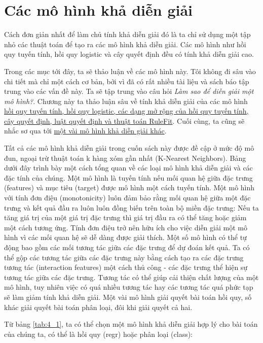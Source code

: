 \chapter{Các mô hình khả diễn giải}
Cách đơn giản nhất để làm chủ tính khả diễn giải đó là ta chỉ sử dụng một tập nhỏ các thuật toán để tạo ra các mô hình khả diễn giải. Các mô hình như hồi quy tuyến tính, hồi quy logistic và cây quyết định đều có tính khả diễn giải cao.

Trong các mục tới đây, ta sẽ thảo luận về các mô hình này. Tôi không đi sâu vào chi tiết mà chỉ một cách cơ bản, bởi vì đã có rất nhiều tài liệu và sách báo tập trung vào các vấn đề này. Ta sẽ tập trung vào câu hỏi \textit{Làm sao để diễn giải một mô hình?}. Chương này ta thảo luận sâu về tính khả diễn giải của các mô hình \href{TODO}{hồi quy tuyến tính, hồi quy logistic, các dạng mở rộng của hồi quy tuyến tính, cây quyết định, luật quyết định và thuật toán RuleFit}. Cuối cùng, ta cũng sẽ nhắc sơ qua tới \href{TODO}{một vài mô hình khả diễn giải khác}. 

Tất cả các mô hình khả diễn giải trong cuốn sách này được đề cập ở mức độ mô đun, ngoại trừ thuật toán k hàng xóm gần nhất (K-Nearest Neighbors). Bảng dưới đây trình bày một cách tổng quan về các loại mô hình khả diễn giải và các đặc tính của chúng. Một mô hình là tuyến tính nếu mối quan hệ giữa đặc trưng (features) và mục tiêu (target) được mô hình một cách tuyến tính. Một mô hình với tính đơn điệu (monotonicity) luôn đảm bảo rằng mối quan hệ giữa một đặc trưng và kết quả đầu ra luôn luôn đồng biến trên toàn bộ miền đặc trưng: Nếu ta tăng giá trị của một giá trị đặc trưng thì giá trị đầu ra có thể tăng hoặc giảm một cách tương ứng. Tính đơn điệu trở nên hữu ích cho việc diễn giải một mô hình vì các mối quan hệ sẽ dễ dàng được giải thích. Một số mô hình có thể tự động bao gồm các mối tương tác giữa các đặc trưng để dự đoán kết quả. Ta có thể gộp các tương tác giữa các đặc trưng này bằng cách tạo ra các đặc trưng tương tác (interaction features) một cách thủ công - các đặc trưng thể hiện sự tương tác giữa các đặc trưng. Tương tác có thể giúp cải thiện chất lượng của một mô hình, tuy nhiên việc có quá nhiều tương tác hay các tương tác quá phức tạp sẽ làm giảm tính khả diễn giải. Một vài mô hình giải quyết bài toán hồi quy, số khác giải quyết bài toán phân loại, đôi khi giải quyết cả hai.

Từ bảng \ref{tab:4_1}, ta có thể chọn một mô hình khả diễn giải hợp lý cho bài toán của chúng ta, có thể là hồi quy (regr) hoặc phân loại (class): 

